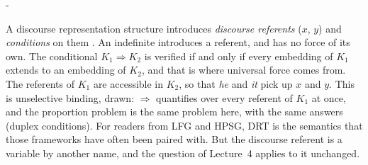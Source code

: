\documentclass[
  layout=tufte,           %
  twoside=false, open=any,
  font=pagella,
  chapterprefix=false,
  numbers=noendperiod,    %
  headings=optiontohead,  %
  parskip=half-,          %
  colorlinks=true,
  examples=gb4e,
  minsyn=true,            %
  bib=natbib, bibstyle=glossa, bibfile=keio,
  greek=false,
]{gtbook}
\makeatletter
\providecommand\pIIneedspace[1]{\par\penalty-100\begingroup
  \setlength\dimen@{#1}\dimen@ii\pagegoal\advance\dimen@ii-\pagetotal
  \ifdim\dimen@>\dimen@ii\ifdim\dimen@ii>\z@\vfil\fi\break\fi\endgroup}
\makeatother
\begin{document}
\pIIneedspace{5cm}
\begin{excursus}
\begin{center}
\end{center}
A discourse representation structure introduces \emph{discourse referents} ($x$, $y$) and \emph{conditions} on them \citep{Kamp1981,KampReyle1993}. An indefinite introduces a referent, and has no force of its own. The conditional $K_1 \Rightarrow K_2$ is verified if and only if every embedding of $K_1$ extends to an embedding of $K_2$, and that is where universal force comes from. The referents of $K_1$ are accessible in $K_2$, so that \textit{he} and \textit{it} pick up $x$ and $y$. This is unselective binding, drawn: $\Rightarrow$ quantifies over every referent of $K_1$ at once, and the proportion problem is the same problem here, with the same answers (duplex conditions). For readers from LFG and HPSG, DRT is the semantics that those frameworks have often been paired with. But the discourse referent is a variable by another name, and the question of Lecture~4 applies to it unchanged.
\end{excursus}
\end{document}
